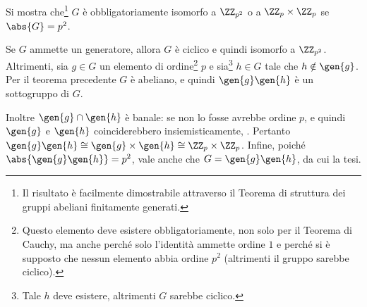 \documentclass[12pt]{scrartcl}
\begin{document}
	
	\begin{example}
		Si mostra che\footnote{
			Il risultato è facilmente dimostrabile attraverso
			il Teorema di struttura dei gruppi abeliani
			finitamente generati.
		} $G$ è obbligatoriamente isomorfo a
		$\ZZ_{p^2}$ o a $\ZZ_p \times \ZZ_p$ se
		$\abs{G} = p^2$. \vskip 0.1in
		

		Se $G$ ammette un generatore,
		allora $G$ è ciclico e quindi isomorfo a $\ZZ_{p^2}$.
		Altrimenti, sia $g \in G$ un elemento di ordine\footnote{
			Questo elemento deve esistere obbligatoriamente, non
			solo per il Teorema di Cauchy, ma anche perché solo
			l'identità ammette ordine $1$ e perché si è supposto
			che nessun elemento abbia ordine $p^2$ (altrimenti
			il gruppo sarebbe ciclico).
		} $p$ e sia\footnote{
			Tale $h$ deve esistere, altrimenti $G$ sarebbe ciclico.
		} $h \in G$ tale che $h \notin \gen{g}$. Per il teorema
		precedente $G$ è abeliano, e quindi $\gen{g}\gen{h}$ è
		un sottogruppo di $G$. \medskip
		
		
		Inoltre $\gen{g} \cap \gen{h}$ è
		banale: se non lo fosse avrebbe ordine $p$, e quindi
		$\gen{g}$ e $\gen{h}$ coinciderebbero insiemisticamente,
		\Lightning. Pertanto $\gen{g}\gen{h} \cong \gen{g}
		\times \gen{h} \cong \ZZ_p \times \ZZ_p$. Infine, poiché
		$\abs{\gen{g} \gen{h}} = p^2$, vale anche che
		$G = \gen{g} \gen{h}$, da cui la tesi.
	\end{example}
\end{document}
